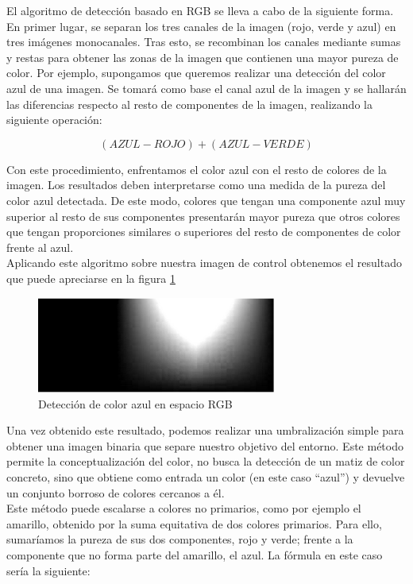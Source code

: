 El algoritmo de detección basado en RGB se lleva a cabo de la siguiente forma. En primer lugar, se separan los tres canales de la imagen (rojo, verde y azul) en tres imágenes monocanales. Tras esto, se recombinan los canales mediante sumas y restas para obtener las zonas de la imagen que contienen una mayor pureza de color. Por ejemplo, supongamos que queremos realizar una detección del color azul de una imagen. Se tomará como base el canal azul de la imagen y se hallarán las diferencias respecto al resto de componentes de la imagen, realizando la siguiente operación:

\[(AZUL - ROJO) + (AZUL - VERDE)\]

Con este procedimiento, enfrentamos el color azul con el resto de colores de la imagen. Los resultados deben interpretarse como una medida de la pureza del color azul detectada. De este modo, colores que tengan una componente azul muy superior al resto de sus componentes presentarán mayor pureza que otros colores que tengan proporciones similares o superiores del resto de componentes de color frente al azul.\\

Aplicando este algoritmo sobre nuestra imagen de control obtenemos el resultado que puede apreciarse en la figura \ref{rgbazul}\\

\begin{figure}[h]
\centering
\includegraphics[width=0.7\textwidth]{images/rgbazul}%
\caption{Detección de color azul en espacio RGB}
\label{rgbazul}
\end{figure}
\FloatBarrier

Una vez obtenido este resultado, podemos realizar una umbralización simple para obtener una imagen binaria que separe nuestro objetivo del entorno. Este método permite la conceptualización del color, no busca la detección de un matiz de color concreto, sino que obtiene como entrada un color (en este caso “azul”) y devuelve un conjunto borroso de colores cercanos a él.\\

Este método puede escalarse a colores no primarios, como por ejemplo el amarillo, obtenido por la suma equitativa de dos colores primarios. Para ello, sumaríamos la pureza de sus dos componentes, rojo y verde; frente a la componente que no forma parte del amarillo, el azul. La fórmula en este caso sería la siguiente:

